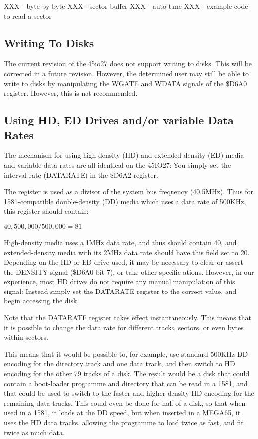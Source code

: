 XXX - byte-by-byte
XXX - sector-buffer
XXX - auto-tune
XXX - example code to read a sector

\subsection{Writing To Disks}

The current revision of the 45io27 does not support writing to disks.
This will be corrected in a future revision.  However, the determined
user may still be able to write to disks by manipulating the WGATE and
WDATA signals of the \$D6A0 register.  However, this is not
recommended.

\subsection{Using HD, ED Drives and/or variable Data Rates}

The mechanism for using high-density (HD) and extended-density (ED)
media and variable data rates are all identical on the 45IO27:  You
simply set the interval rate (DATARATE) in the \$D6A2 register.

The register is used as a divisor of the system bus frequency
(40.5MHz).  Thus for 1581-compatible double-density (DD) media which
uses a data rate of 500KHz, this register should contain:

$40,500,000 / 500,000 = 81$

High-density media uses a 1MHz data rate, and thus should contain 40,
and extended-density media with its 2MHz data rate should have this
field set to 20.  Depending on the HD or ED drive used, it may be
necessary to clear or assert the DENSITY signal (\$D6A0 bit 7), or
take other specific ations.  However, in our experience, most HD
drives do not require any manual manipulation of this signal: Instead
simply set the DATARATE register to the correct value, and begin
accessing the disk.

Note that the DATARATE register takes effect instantaneously.  This
means that it is possible to change the data rate for different
tracks, sectors, or even bytes within sectors.

This means that it
would be possible to, for example, use standard 500KHz DD encoding for
the directory track and one data track, and then switch to HD encoding for the other 79
tracks of a disk. The result would be a disk that could contain a
boot-loader programme and directory that can be read in a 1581, and
that could be used to switch to the faster and higher-density HD
encoding for the remaining data tracks.  This could even be done for
half of a disk, so that when used in a 1581, it loads at the DD speed,
but when inserted in a MEGA65, it uses the HD data tracks, allowing
the programme to load twice as fast, and fit twice as much data.

